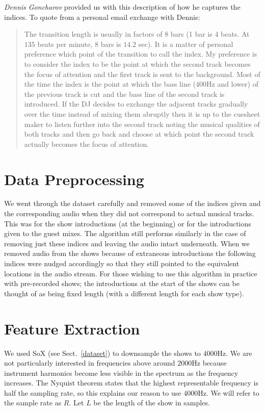 \documentclass[twocolumn]{article}
\begin{document}
\textit{Dennis Goncharov} provided us with this description of how he captures the indices. To quote from a personal email exchange with Dennis:

\begin{quote}
The transition length is usually in factors of $8$ bars (1 bar is $4$ beats. At $135$ beats per minute, $8$ bars is $14.2$ sec). It is a matter of personal preference which point of the transition to call the index. My preference is to consider the index to be the point at which the second track becomes the focus of attention and the first track is sent to the background. Most of the time the index is the point at which the bass line ($400$Hz and lower) of the previous track is cut and the bass line of the second track is introduced. If the DJ decides to exchange the adjacent tracks gradually over the time instead of mixing them abruptly then it is up to the cuesheet maker to listen further into the second track noting the musical qualities of both tracks and then go back and choose at which point the second track actually becomes the focus of attention.
\end{quote}


\section{Data Preprocessing}\label{proprocessing} %

We went through the dataset carefully and removed some of the indices given and the corresponding audio when they did not correspond to actual musical tracks. This was for the show introductions (at the beginning) or for the introductions given to the guest mixes. The algorithm still performs similarly in the case of removing just these indices and leaving the audio intact underneath. When we removed audio from the shows because of extraneous introductions the following indices were nudged accordingly so that they still pointed to the equivalent locations in the audio stream. For those wishing to use this algorithm in practice with pre-recorded shows; the introductions at the start of the shows can be thought of as being fixed length (with a different length for each show type).

\section{Feature Extraction}\label{feat_ex} %

We used SoX (see Sect.~\ref{dataset}) to downsample the shows to $4000$Hz. We are not particularly interested in frequencies above around $2000$Hz because instrument harmonics become less visible in the spectrum as the frequency increases. The Nyquist theorem \cite{nyquist1928certain} states that the highest representable frequency is half the sampling rate, so this explains our reason to use $4000$Hz. We will refer to the sample rate as $R$. Let $L$ be the length of the show in samples.
\end{document}
